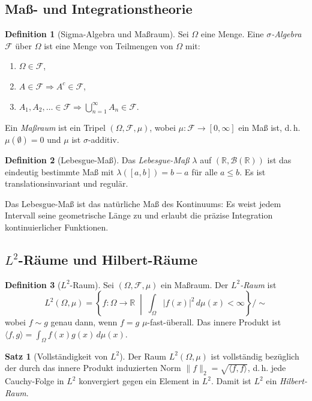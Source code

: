 ﻿\documentclass[a4paper,12pt]{article}
\theoremstyle{definition}
\newtheorem{definition}{Definition}
\newtheorem{satz}{Satz}
\begin{document}
\subsection{Maß- und Integrationstheorie}

\begin{definition}[Sigma-Algebra und Maßraum]
Sei $\Omega$ eine Menge.  Eine \emph{$\sigma$-Algebra} $\mathcal{F}$ über $\Omega$ ist eine
Menge von Teilmengen von $\Omega$ mit:
\begin{enumerate}
    \item $\Omega \in \mathcal{F}$,
    \item $A \in \mathcal{F} \Rightarrow A^c \in \mathcal{F}$,
    \item $A_1, A_2, \ldots \in \mathcal{F} \Rightarrow \bigcup_{n=1}^\infty A_n \in \mathcal{F}$.
\end{enumerate}
Ein \emph{Maßraum} ist ein Tripel $(\Omega, \mathcal{F}, \mu)$, wobei
$\mu: \mathcal{F} \to [0,\infty]$ ein Maß ist, d.\,h. $\mu(\emptyset)=0$ und
$\mu$ ist $\sigma$-additiv.
\end{definition}

\begin{definition}[Lebesgue-Maß]
Das \emph{Lebesgue-Maß} $\lambda$ auf $(\mathbb{R}, \mathcal{B}(\mathbb{R}))$ ist
das eindeutig bestimmte Maß mit $\lambda([a,b]) = b-a$ für alle $a \leq b$.
Es ist translationsinvariant und regulär.
\end{definition}

Das Lebesgue-Maß ist das natürliche Maß des Kontinuums: Es weist jedem Intervall
seine geometrische Länge zu und erlaubt die präzise Integration kontinuierlicher Funktionen.

\subsection{$L^2$-Räume und Hilbert-Räume}

\begin{definition}[$L^2$-Raum]
\label{def:l2}
Sei $(\Omega, \mathcal{F}, \mu)$ ein Maßraum.  Der \emph{$L^2$-Raum} ist
\[
L^2(\Omega, \mu) = \left\{ f: \Omega \to \mathbb{R} \;\middle|\;
\int_\Omega |f(x)|^2 \, d\mu(x) < \infty \right\} / \!\!\sim
\]
wobei $f \sim g$ genau dann, wenn $f=g$ $\mu$-fast-überall.
Das innere Produkt ist $\langle f, g \rangle = \int_\Omega f(x) g(x) \, d\mu(x)$.
\end{definition}

\begin{satz}[Vollständigkeit von $L^2$]
\label{satz:vollstaendigkeit}
Der Raum $L^2(\Omega, \mu)$ ist vollständig bezüglich der durch das innere Produkt
induzierten Norm $\|f\|_2 = \sqrt{\langle f,f\rangle}$, d.\,h. jede Cauchy-Folge
in $L^2$ konvergiert gegen ein Element in $L^2$.  Damit ist $L^2$ ein
\emph{Hilbert-Raum}.
\end{satz}
\end{document}
